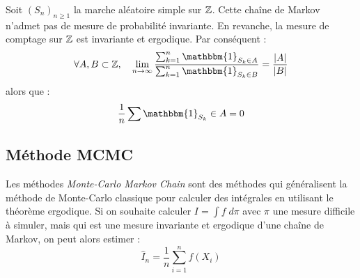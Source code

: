 
\begin{example}
    Soit $(S_n)_{n \geqslant 1}$ la marche aléatoire simple sur $\mathbb{Z}$. Cette chaîne de Markov n'admet pas de 
    mesure de probabilité invariante. En revanche, la mesure de comptage sur $\mathbb{Z}$ est invariante et ergodique. Par conséquent : 
        $$ \forall A, B \subset \Z, \quad \lim_{n \to \infty} \frac{\sum_{k=1}^{n} \mathbbm{1}_{S_k \in A}}{\sum_{k=1}^{n} \mathbbm{1}_{S_k \in B  }} = \frac{|A|}{|B|} $$
    alors que : 
        $$ \frac{1}{n} \sum \mathbbm{1}_{S_k} \in A = 0 $$   
\end{example}

\subsection{Méthode MCMC}


Les méthodes \emph{Monte-Carlo Markov Chain} sont des méthodes qui généralisent la méthode de Monte-Carlo classique 
pour calculer des intégrales en utilisant le théorème ergodique. Si on souhaite calculer $I = \int f \; d \pi$ avec $ \pi$ une mesure difficile à simuler, 
mais qui est une mesure invariante et ergodique d'une chaîne de Markov, on peut alors estimer : 
    $$ \hat{I}_n = \frac{1}{n} \sum_{i=1}^{n} f(X_i) $$ 

